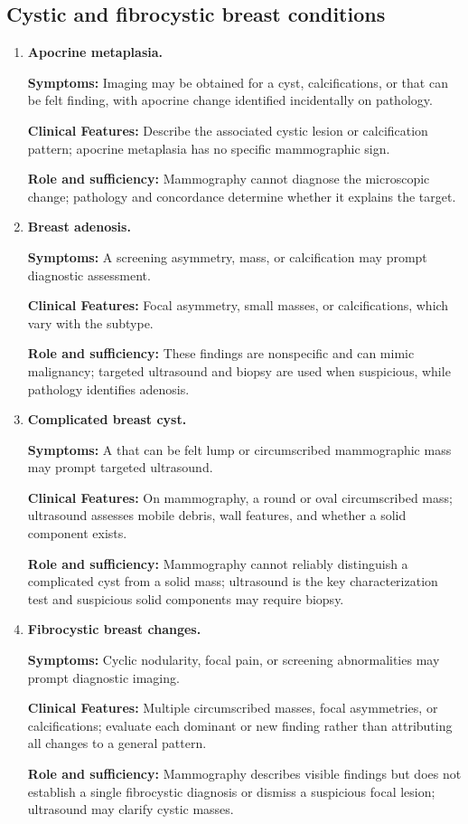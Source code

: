 \subsection{Cystic and fibrocystic breast conditions}
\begin{enumerate}[leftmargin=*,itemsep=0.45em,topsep=0.4em]
\item \textbf{Apocrine metaplasia.}\par\noindent\textbf{Symptoms:} Imaging may be obtained for a cyst, calcifications, or that can be felt finding, with apocrine change identified incidentally on pathology.\par\noindent\textbf{Clinical Features:} Describe the associated cystic lesion or calcification pattern; apocrine metaplasia has no specific mammographic sign.\par\noindent\textbf{Role and sufficiency:} Mammography cannot diagnose the microscopic change; pathology and concordance determine whether it explains the target.
\item \textbf{Breast adenosis.}\par\noindent\textbf{Symptoms:} A screening asymmetry, mass, or calcification may prompt diagnostic assessment.\par\noindent\textbf{Clinical Features:} Focal asymmetry, small masses, or calcifications, which vary with the subtype.\par\noindent\textbf{Role and sufficiency:} These findings are nonspecific and can mimic malignancy; targeted ultrasound and biopsy are used when suspicious, while pathology identifies adenosis.
\item \textbf{Complicated breast cyst.}\par\noindent\textbf{Symptoms:} A that can be felt lump or circumscribed mammographic mass may prompt targeted ultrasound.\par\noindent\textbf{Clinical Features:} On mammography, a round or oval circumscribed mass; ultrasound assesses mobile debris, wall features, and whether a solid component exists.\par\noindent\textbf{Role and sufficiency:} Mammography cannot reliably distinguish a complicated cyst from a solid mass; ultrasound is the key characterization test and suspicious solid components may require biopsy.
\item \textbf{Fibrocystic breast changes.}\par\noindent\textbf{Symptoms:} Cyclic nodularity, focal pain, or screening abnormalities may prompt diagnostic imaging.\par\noindent\textbf{Clinical Features:} Multiple circumscribed masses, focal asymmetries, or calcifications; evaluate each dominant or new finding rather than attributing all changes to a general pattern.\par\noindent\textbf{Role and sufficiency:} Mammography describes visible findings but does not establish a single fibrocystic diagnosis or dismiss a suspicious focal lesion; ultrasound may clarify cystic masses.

\end{enumerate}
